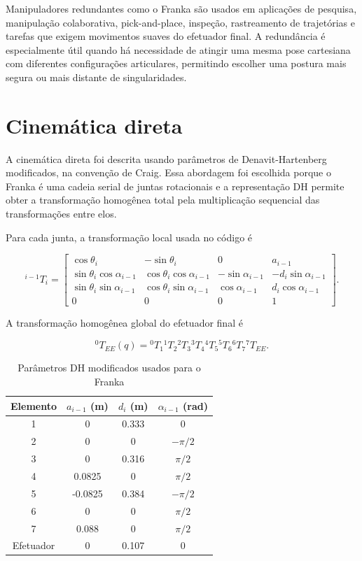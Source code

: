 \documentclass{article}
\begin{document}
Manipuladores redundantes como o Franka são usados em aplicações de pesquisa,
manipulação colaborativa, pick-and-place, inspeção, rastreamento de trajetórias
e tarefas que exigem movimentos suaves do efetuador final. A redundância é
especialmente útil quando há necessidade de atingir uma mesma pose cartesiana
com diferentes configurações articulares, permitindo escolher uma postura mais
segura ou mais distante de singularidades.

\section{Cinemática direta}

A cinemática direta foi descrita usando parâmetros de Denavit-Hartenberg
modificados, na convenção de Craig. Essa abordagem foi escolhida porque o
Franka é uma cadeia serial de juntas rotacionais e a representação DH permite
obter a transformação homogênea total pela multiplicação sequencial das
transformações entre elos.

Para cada junta, a transformação local usada no código é

\[
{}^{i-1}T_i =
\begin{bmatrix}
\cos\theta_i & -\sin\theta_i & 0 & a_{i-1}\\
\sin\theta_i\cos\alpha_{i-1} & \cos\theta_i\cos\alpha_{i-1} &
-\sin\alpha_{i-1} & -d_i\sin\alpha_{i-1}\\
\sin\theta_i\sin\alpha_{i-1} & \cos\theta_i\sin\alpha_{i-1} &
\cos\alpha_{i-1} & d_i\cos\alpha_{i-1}\\
0 & 0 & 0 & 1
\end{bmatrix}.
\]

A transformação homogênea global do efetuador final é

\[
{}^{0}T_{EE}(q) =
{}^{0}T_1
{}^{1}T_2
{}^{2}T_3
{}^{3}T_4
{}^{4}T_5
{}^{5}T_6
{}^{6}T_7
{}^{7}T_{EE}.
\]

\begin{table}[h]
\centering
\caption{Parâmetros DH modificados usados para o Franka}
\begin{tabular}{cccc}
\toprule
Elemento & $a_{i-1}$ (m) & $d_i$ (m) & $\alpha_{i-1}$ (rad)\\
\midrule
1 & 0 & 0.333 & 0\\
2 & 0 & 0 & $-\pi/2$\\
3 & 0 & 0.316 & $\pi/2$\\
4 & 0.0825 & 0 & $\pi/2$\\
5 & -0.0825 & 0.384 & $-\pi/2$\\
6 & 0 & 0 & $\pi/2$\\
7 & 0.088 & 0 & $\pi/2$\\
Efetuador & 0 & 0.107 & 0\\
\bottomrule
\end{tabular}
\end{table}
\end{document}
